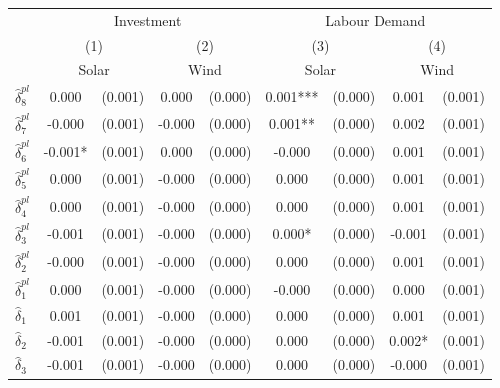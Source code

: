 {
\def\sym#1{\ifmmode^{#1}\else\(^{#1}\)\fi}
\begin{tabular}{l*{4}{cc}}
\toprule
            &\multicolumn{4}{c}{Investment}                           &\multicolumn{4}{c}{Labour Demand}                        \\\cmidrule(lr){2-5}\cmidrule(lr){6-9}
            &\multicolumn{2}{c}{(1)}     &\multicolumn{2}{c}{(2)}     &\multicolumn{2}{c}{(3)}     &\multicolumn{2}{c}{(4)}     \\
            &\multicolumn{2}{c}{Solar}   &\multicolumn{2}{c}{Wind}    &\multicolumn{2}{c}{Solar}   &\multicolumn{2}{c}{Wind}    \\
\midrule
$\hat{\delta}_8^{pl}$&       0.000   &     (0.001)&       0.000   &     (0.000)&       0.001***&     (0.000)&       0.001   &     (0.001)\\
$\hat{\delta}_7^{pl}$&      -0.000   &     (0.001)&      -0.000   &     (0.000)&       0.001** &     (0.000)&       0.002   &     (0.001)\\
$\hat{\delta}_6^{pl}$&      -0.001*  &     (0.001)&       0.000   &     (0.000)&      -0.000   &     (0.000)&       0.001   &     (0.001)\\
$\hat{\delta}_5^{pl}$&       0.000   &     (0.001)&      -0.000   &     (0.000)&       0.000   &     (0.000)&       0.001   &     (0.001)\\
$\hat{\delta}_4^{pl}$&       0.000   &     (0.001)&      -0.000   &     (0.000)&       0.000   &     (0.000)&       0.001   &     (0.001)\\
$\hat{\delta}_3^{pl}$&      -0.001   &     (0.001)&      -0.000   &     (0.000)&       0.000*  &     (0.000)&      -0.001   &     (0.001)\\
$\hat{\delta}_2^{pl}$&      -0.000   &     (0.001)&      -0.000   &     (0.000)&       0.000   &     (0.000)&       0.001   &     (0.001)\\
$\hat{\delta}_1^{pl}$&       0.000   &     (0.001)&      -0.000   &     (0.000)&      -0.000   &     (0.000)&       0.000   &     (0.001)\\
$\hat{\delta}_1$&       0.001   &     (0.001)&      -0.000   &     (0.000)&       0.000   &     (0.000)&       0.001   &     (0.001)\\
$\hat{\delta}_2$&      -0.001   &     (0.001)&      -0.000   &     (0.000)&       0.000   &     (0.000)&       0.002*  &     (0.001)\\
$\hat{\delta}_3$&      -0.001   &     (0.001)&      -0.000   &     (0.000)&       0.000   &     (0.000)&      -0.000   &     (0.001)\\

\end{tabular}}
